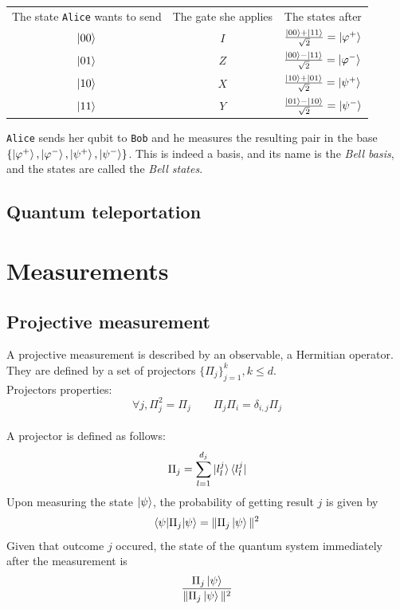 \documentclass{article}
\begin{document}
\begin{table}[h]
    \centering
    \begin{tabular}{c|c|c}
    The state \texttt{Alice} wants to send & The gate she applies & The states
    after \\
    $\ket{00}$ & $I$ & $\frac{\ket{00} + \ket{11}}{\sqrt{2}} = \ket{\varphi^+}$  \\
    $\ket{01}$ & $Z$ & $\frac{\ket{00} - \ket{11}}{\sqrt{2}} = \ket{\varphi^-}$ \\
    $\ket{10}$ & $X$ & $\frac{\ket{10} + \ket{01}}{\sqrt{2}} = \ket{\psi^+}$ \\
    $\ket{11}$ & $Y$ & $\frac{\ket{01} - \ket{10}}{\sqrt{2}} = \ket{\psi^-}$
    \end{tabular}
\end{table}
\texttt{Alice} sends her qubit to \texttt{Bob} and he measures the resulting pair
in the base \\
$\{\ket{\varphi^+}, \ket{\varphi^-},\ket{\psi^+}, \ket{\psi^-}\}$. This is indeed a
basis, and its name is the \textit{Bell basis}, and the states are called the
\textit{Bell states}.


\subsection{Quantum teleportation}

\section{Measurements}
\subsection{Projective measurement}
A projective measurement is described by an observable, a Hermitian operator.
They are defined by a set of projectors $\{\Pi_j\}_{j=1}^k, k \leq d$.\\
Projectors properties:
\begin{equation}
    \forall j, \Pi_j^2 = \Pi_j \qquad \Pi_j\Pi_i = \delta_{i,j}\Pi_j
\end{equation}
\\\noindent A projector is defined as follows:
\begin{equation}
    \Pi_j = \sum_{l=1}^{d_j}\ket{l_l^j}\bra{l_l^j}
\end{equation}
Upon measuring the state $\ket{\psi}$, the probability of getting result $j$ is
given by
\begin{equation}
    \braket{\psi|\Pi_j|\psi} = \| \Pi_j\ket{\psi}\|^2
\end{equation}
Given that outcome $j$ occured, the state of the quantum system immediately
after the measurement is
\begin{equation}
    \frac{\Pi_j\ket{\psi}}{\| \Pi_j\ket{\psi}\|^2}
\end{equation}
\end{document}
